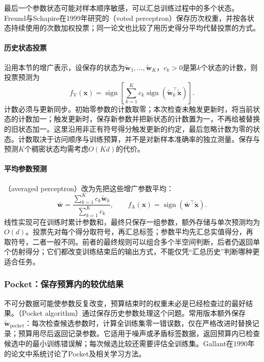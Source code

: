 最后一个参数状态可能对样本顺序敏感，可以汇总训练过程中的多个状态。Freund与Schapire在1999年研究的（voted perceptron）保存历次权重，并按各状态持续使用的次数加权投票；同一论文也比较了用历史得分平均代替投票的方式。

\paragraph{历史状态投票}
沿用本节的增广表示，设保存的状态为$\tilde{\bm w}_1,\ldots,\tilde{\bm w}_K$，$c_k>0$是第$k$个状态的计数，则投票预测为
\begin{equation}
  f_{\mathrm V}(\bm x)
  =\operatorname{sign}\!\left[
    \sum_{k=1}^{K}c_k\operatorname{sign}
      (\tilde{\bm w}_k^\top\tilde{\bm x})\right].
  \label{eq:classification-voted-perceptron}
\end{equation}
计数必须与更新同步。初始零参数的计数取零；本次检查未触发更新时，将当前状态的计数加一；触发更新时，保存新参数并把新状态的计数置为一，不再给被替换的旧状态加一。这里沿用非正有符号得分触发更新的约定，最后忽略计数为零的状态。计数取决于访问顺序与训练预算，并不是对新样本准确率的独立测量。保存与预测$K$个稠密状态均需考虑$O(Kd)$的代价。

\paragraph{平均参数预测}
（averaged perceptron）改为先把这些增广参数平均：
\[
  \bar{\bm w}=\frac{\sum_{k=1}^{K}c_k\tilde{\bm w}_k}
                        {\sum_{k=1}^{K}c_k},
  \qquad
  f_{\mathrm A}(\bm x)=\operatorname{sign}
                    (\bar{\bm w}^\top\tilde{\bm x}).
\]
线性实现可在训练时累计参数和，最终只保存一组参数，额外存储与单次预测均为$O(d)$。投票先对每个得分取符号，再汇总标签；参数平均先汇总实值得分，再取符号，二者一般不同。前者的最终规则可以组合多个半空间判断，后者仍返回单个仿射得分；它们都改变训练结束后的输出方式，不能仅凭“汇总历史”判断哪种更适合任务。

\subsubsection{Pocket：保存预算内的较优结果}
\label{sec:classification-pocket}

不可分数据可能使参数反复改变，预算结束时的权重未必是已经检查过的最好结果。（Pocket algorithm）通过保存历史参数处理这个问题。常用版本额外保存$\tilde{\bm{w}}_{\mathrm{pocket}}$：每次检查候选参数时，计算全训练集零一错误数，仅在严格改进时替换记录；预算用尽后返回记录参数。它适用于噪声或矛盾标签数据，返回预算内已检查候选中的最小训练错误解；每次候选比较还需要评估全训练集。Gallant在1990年的论文中系统讨论了Pocket及相关学习方法。

